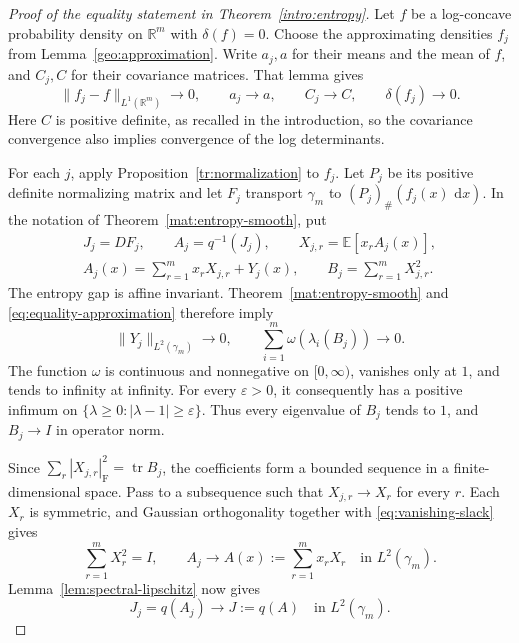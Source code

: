 \documentclass[11pt]{article}
\newcommand{\R}{\mathbb R}
\newcommand{\Dgap}{\delta}
\newcommand{\E}{\mathbb E}
\DeclareMathOperator{\tr}{tr}
\newcommand{\dd}{\,\mathrm d}
\newcommand{\norm}[1]{\lVert #1\rVert}
\theoremstyle{definition}
\theoremstyle{remark}
\numberwithin{equation}{section}
\begin{document}
\begin{proof}[Proof of the equality statement in Theorem~\ref{intro:entropy}]
Let $f$ be a log-concave probability density on $\R^m$ with
$\Dgap(f)=0$.  Choose the approximating densities $f_j$ from
Lemma~\ref{geo:approximation}.  Write $a_j,a$ for their means and the mean of
$f$, and $C_j,C$ for their covariance matrices.  That lemma gives
\begin{equation}\label{eq:equality-approximation}
  \norm{f_j-f}_{L^1(\R^m)}\longrightarrow0,\qquad
  a_j\longrightarrow a,\qquad C_j\longrightarrow C,\qquad
  \Dgap(f_j)\longrightarrow0.
\end{equation}
Here $C$ is positive definite, as recalled in the introduction, so the
covariance convergence also implies convergence of the log determinants.

For each $j$, apply Proposition~\ref{tr:normalization} to $f_j$.
Let $P_j$ be its positive definite normalizing matrix and let $F_j$
transport $\gamma_m$ to $(P_j)_\#(f_j(x)\,\dd x)$.  In the notation
of Theorem~\ref{mat:entropy-smooth}, put
\[
 \begin{gathered}
  J_j=DF_j,\qquad A_j=q^{-1}(J_j),\qquad
  X_{j,r}=\E[x_rA_j(x)],\\
  A_j(x)=\sum_{r=1}^m x_rX_{j,r}+Y_j(x),\qquad
  B_j=\sum_{r=1}^m X_{j,r}^2.
 \end{gathered}
\]
The entropy gap is affine invariant.  Theorem~\ref{mat:entropy-smooth} and
\eqref{eq:equality-approximation} therefore imply
\begin{equation}\label{eq:vanishing-slack}
  \norm{Y_j}_{L^2(\gamma_m)}\longrightarrow0,
  \qquad
  \sum_{i=1}^m \omega(\lambda_i(B_j))\longrightarrow0.
\end{equation}
The function $\omega$ is continuous and nonnegative on $[0,\infty)$,
vanishes only at $1$, and tends to infinity at infinity.
For every $\varepsilon>0$, it consequently has a positive infimum on
$\{\lambda\ge0:|\lambda-1|\ge\varepsilon\}$.  Thus every eigenvalue
of $B_j$ tends to $1$, and $B_j\to I$ in operator norm.

Since $\sum_r|X_{j,r}|_{\mathrm F}^2=\tr B_j$, the coefficients form
a bounded sequence in a finite-dimensional space.  Pass to a subsequence
such that $X_{j,r}\to X_r$ for every $r$.  Each $X_r$ is symmetric,
and Gaussian orthogonality together with \eqref{eq:vanishing-slack}
gives
\begin{equation}\label{eq:linear-field-limit}
  \sum_{r=1}^mX_r^2=I,\qquad
  A_j\longrightarrow A(x):=\sum_{r=1}^m x_rX_r
      \quad\text{in }L^2(\gamma_m).
\end{equation}
Lemma~\ref{lem:spectral-lipschitz} now gives
\begin{equation}\label{eq:jacobian-limit}
  J_j=q(A_j)\longrightarrow J:=q(A)
      \quad\text{in }L^2(\gamma_m).
\end{equation}


\end{proof}
\end{document}
